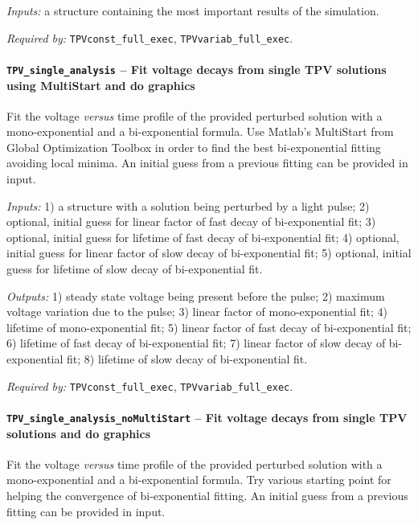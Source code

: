 		\textit{Inputs:} a structure containing the most important results of the  simulation.

		\textit{Required by:} \texttt{TPV\-const\_full\_exec}, \texttt{TPV\-variab\_full\_exec}.

		\paragraph{\texttt{TPV\_single\_analysis} -- Fit voltage decays from single TPV solutions using MultiStart and do graphics}
		Fit the voltage \textsl{versus} time profile of the provided perturbed solution with a mono\hyp{}exponential and a bi\hyp{}exponential formula.
		Use Matlab's MultiStart from Global Optimization Toolbox in order to find the best bi\hyp{}exponential fitting avoiding local minima.
		An initial guess from a previous fitting can be provided in input.

		\textit{Inputs:} 1) a structure with a solution being perturbed by a light pulse;
		2) optional, initial guess for linear factor of fast decay of bi-exponential fit;
		3) optional, initial guess for lifetime of fast decay of bi-exponential fit;
		4) optional, initial guess for linear factor of slow decay of bi-exponential fit;
		5) optional, initial guess for lifetime of slow decay of bi-exponential fit.

		\textit{Outputs:} 1) steady state voltage being present before the pulse;
		2) maximum voltage variation due to the pulse;
		3) linear factor of mono-exponential fit;
		4) lifetime of mono-exponential fit;
		5) linear factor of fast decay of bi-exponential fit;
		6) lifetime of fast decay of bi-exponential fit;
		7) linear factor of slow decay of bi-exponential fit;
		8) lifetime of slow decay of bi-exponential fit.

		\textit{Required by:} \texttt{TPV\-const\_full\_exec}, \texttt{TPV\-variab\_full\_exec}.

		\paragraph{\texttt{TPV\_single\_analysis\_noMulti\-Start} -- Fit voltage decays from single TPV solutions and do graphics}
		Fit the voltage \textsl{versus} time profile of the provided perturbed solution with a mono\hyp{}exponential and a bi\hyp{}exponential formula.
		Try various starting point for helping the convergence of bi\hyp{}exponential fitting.
		An initial guess from a previous fitting can be provided in input.

